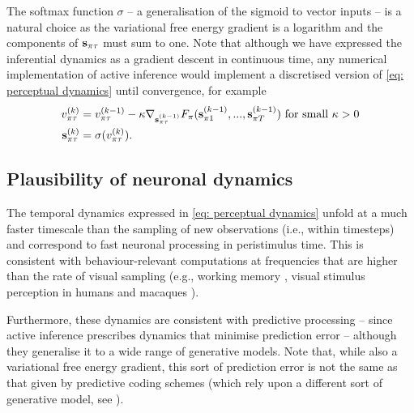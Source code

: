 \documentclass[review,12pt,authoryear]{elsarticle}
\begin{document}
The softmax function $\sigma$ – a generalisation of the sigmoid to vector inputs – is a natural choice as the variational free energy gradient is a logarithm and the components of $\bold s_{\pi\tau}$ must sum to one. Note that although we have expressed the inferential dynamics as a gradient descent in continuous time, any numerical implementation of active inference would implement a discretised version of \eqref{eq: perceptual dynamics} until convergence, for example
  	\begin{equation*}
  	    \begin{split}
  	         v_{\pi \tau}^{(k)}&= v_{\pi \tau}^{(k-1)} -\kappa \nabla_{\bold s^{(k-1)}_{\pi\tau}} F_\pi(\bold s^{(k-1)}_{\pi 1},...,\bold s^{(k-1)}_{\pi T}) \text{ for small } \kappa >0 \\
  	        \bold s_{\pi\tau}^{(k)} &= \sigma (v_{\pi \tau}^{(k)}).
  	    \end{split}
  	\end{equation*}

\subsection{Plausibility of neuronal dynamics}
\label{sec: plausibility of neuronal dynamics}

The temporal dynamics expressed in \eqref{eq: perceptual dynamics} unfold at a much faster timescale than the sampling of new observations (i.e., within timesteps) and correspond to fast neuronal processing in peristimulus time. This is consistent with behaviour-relevant computations at frequencies that are higher than the rate of visual sampling (e.g., working memory \citep{lundqvistGammaBetaBursts2016}, visual stimulus perception in humans \citep{hanslmayrPrestimulusOscillatoryPhase2013} and macaques \citep{rollsProcessingSpeedCerebral1994}).

Furthermore, these dynamics are consistent with predictive processing \citep{raoPredictiveCodingVisual1999,bastosCanonicalMicrocircuitsPredictive2012} -- since active inference prescribes dynamics that minimise prediction error -- although they generalise it to a wide range of generative models. Note that, while also a variational free energy gradient, this sort of prediction error is not the same as that given by predictive coding schemes (which rely upon a different sort of generative model, see \citep{buckleyFreeEnergyPrinciple2017,fristonVariationalFreeEnergy2007,bogaczTutorialFreeenergyFramework2017}).
\end{document}
